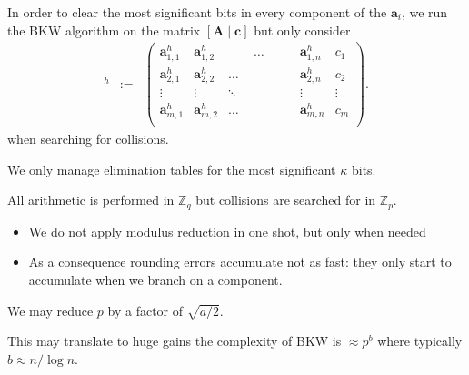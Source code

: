 \documentclass[10pt]{beamer}
\renewcommand{\vec}[1]{\mathbf{#1}\xspace}
\newcommand{\Z}{\ensuremath{\mathbb{Z}}\xspace}
\newcommand{\Zq}{\ensuremath{\Z_q}\xspace}
\newcommand{\Zp}{\ensuremath{\mathbb{Z}_p}\xspace}
\begin{document}
\begin{frame}[allowframebreaks]
In order to clear the most significant bits in every component of the $\vec{a}_{i}$, we run the BKW algorithm on the matrix $[\vec{A} \mid \vec{c}]$ but only consider
\begin{eqnarray*}
[\vec{A},\vec{c}]^h &:=& \left(\begin{array}{ccccc}
       \vec{a}_{1,1}^h & \vec{a}_{1,2}^h & \hspace{2em} \dots \hspace{2em} & \vec{a}_{1,n}^h & c_1\\
       \vec{a}_{2,1}^h & \vec{a}_{2,2}^h & \dots & \vec{a}_{2,n}^h & c_2\\
        \vdots & \vdots & \ddots & \vdots & \vdots\\
       \vec{a}_{m,1}^h & \vec{a}_{m,2}^h & \dots & \vec{a}_{m,n}^h & c_{m}\\
      \end{array}\right).
\end{eqnarray*}
when searching for collisions. 

\vspace{1em}

We only manage elimination tables for the most significant $\kappa$ bits.

All arithmetic is performed in $\Zq$ but collisions are searched for in $\Zp$.

\framebreak

\begin{itemize}
 \item We do not apply modulus reduction in one shot, but only when needed
 \item As a consequence rounding errors accumulate not as fast: they only start to accumulate when we branch on a component.
\end{itemize}

\vspace{1em}

\begin{block}{}
\centering We may reduce $p$ by a factor of $\sqrt{a/2}$.
\end{block}

This may translate to huge gains the complexity of BKW is $\approx p^b$ where typically $b \approx n/\log n$.

\end{frame}
\end{document}
